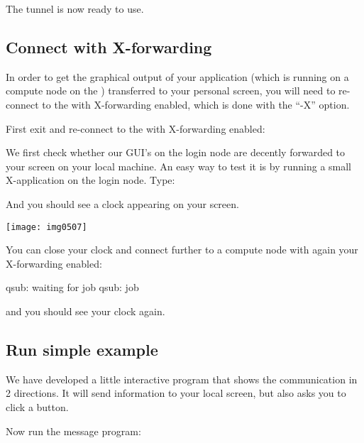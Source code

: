 The tunnel is now ready to use.
\fi

\subsection{Connect with X-forwarding}

In order to get the graphical output of your application (which is running on a
compute node on the \hpc) transferred to your personal screen, you will need
to re-connect to the \hpc with X-forwarding enabled, which is done with the
``-X'' option.

First exit and re-connect to the \hpc with X-forwarding enabled:

\begin{prompt}
\end{prompt}

We first check whether our GUI's on the login node are decently forwarded to
your screen on your local machine. An easy way to test it is by running a small
X-application on the login node. Type:

\begin{prompt}
\end{prompt}

And you should see a clock appearing on your screen.

\texttt{[image: img0507]}

You can close your clock and connect further to a compute node with again your
X-forwarding enabled:

\begin{prompt}
qsub: waiting for job %
qsub: job %
\end{prompt}

and you should see your clock again.

\subsection{Run simple example}

We have developed a little interactive program that shows the communication in
2 directions. It will send information to your local screen, but also asks you
to click a button.

Now run the message program:
\begin{prompt}
\end{prompt}

